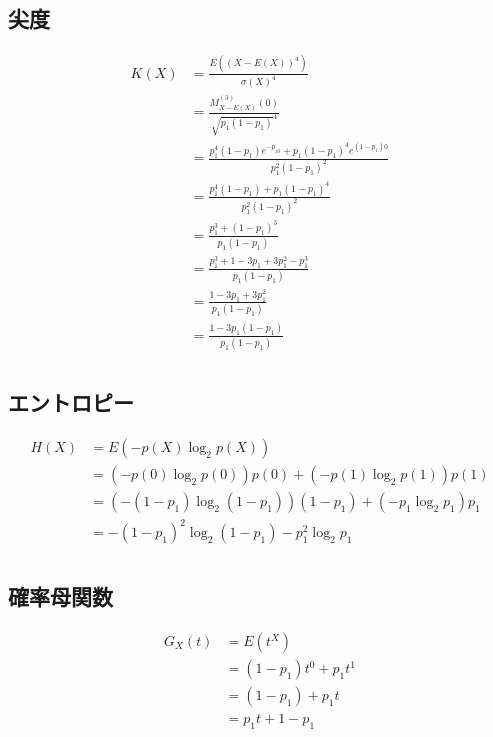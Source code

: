 \documentclass[dvipdfmx]{jsarticle}
\begin{document}
 \subsection{尖度}
 \begin{align}
  K\left(X\right)&=\frac{E\left(\left(X-E\left(X\right)\right)^4\right)}{\sigma\left(X\right)^4}\nonumber\\
  &=\frac{M_{X-E\left(X\right)}^{\left(3\right)}\left(0\right)}{\sqrt{p_1\left(1-p_1\right)}^4}\nonumber\\
  &=\frac{p_1^4\left(1-p_1\right)e^{-p_10}+p_1\left(1-p_1\right)^4e^{\left(1-p_1\right)0}}{p_1^2\left(1-p_1\right)^2}\nonumber\\
  &=\frac{p_1^4\left(1-p_1\right)+p_1\left(1-p_1\right)^4}{p_1^2\left(1-p_1\right)^2}\nonumber\\
  &=\frac{p_1^3+\left(1-p_1\right)^3}{p_1\left(1-p_1\right)}\nonumber\\
  &=\frac{p_1^3+1-3p_1+3p_1^2-p_1^3}{p_1\left(1-p_1\right)}\nonumber\\
  &=\frac{1-3p_1+3p_1^2}{p_1\left(1-p_1\right)}\nonumber\\
  &=\frac{1-3p_1\left(1-p_1\right)}{p_1\left(1-p_1\right)}\nonumber\\
 \end{align}
 \subsection{エントロピー}
 \begin{align}
  H\left(X\right)&=E\left(-p\left(X\right)\log_2p\left(X\right)\right)\nonumber\\
  &=\left(-p\left(0\right)\log_2p\left(0\right)\right)p\left(0\right)+\left(-p\left(1\right)\log_2p\left(1\right)\right)p\left(1\right)\nonumber\\
  &=\left(-\left(1-p_1\right)\log_2\left(1-p_1\right)\right)\left(1-p_1\right)+\left(-p_1\log_2p_1\right)p_1\nonumber\\
  &=-\left(1-p_1\right)^2\log_2\left(1-p_1\right)-p_1^2\log_2p_1\nonumber\\
 \end{align}
 \subsection{確率母関数}
 \begin{align}
  G_X\left(t\right)&=E\left(t^X\right)\nonumber\\
  &=\left(1-p_1\right)t^0+p_1t^1\nonumber\\
  &=\left(1-p_1\right)+p_1t\nonumber\\
  &=p_1t+1-p_1
 \end{align}
\end{document}
